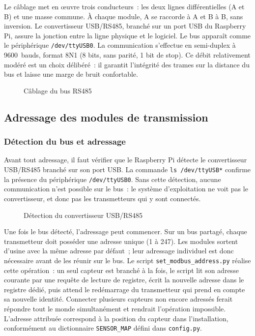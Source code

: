 Le câblage met en œuvre trois conducteurs~: les deux lignes différentielles (A et B) et une masse commune. À chaque module, A se raccorde à A et B à B, sans inversion. Le convertisseur USB/RS485, branché sur un port USB du Raspberry Pi, assure la jonction entre la ligne physique et le logiciel. Le bus apparaît comme le périphérique \texttt{/dev/ttyUSB0}. La communication s'effectue en semi-duplex à 9600~bauds, format 8N1 (8 bits, sans parité, 1 bit de stop). Ce débit relativement modéré est un choix délibéré~: il garantit l'intégrité des trames sur la distance du bus et laisse une marge de bruit confortable.

\begin{figure}[htbp]
  \centering
  \caption{Câblage du bus RS485}
  \label{fig:daisy_chain}
\end{figure}

\subsection{Adressage des modules de transmission}

\subsubsection{Détection du bus et adressage}

Avant tout adressage, il faut vérifier que le Raspberry Pi détecte le convertisseur USB/RS485 branché sur son port USB. La commande \texttt{ls /dev/ttyUSB*} confirme la présence du périphérique \texttt{/dev/ttyUSB0}. Sans cette détection, aucune communication n'est possible sur le bus~: le système d'exploitation ne voit pas le convertisseur, et donc pas les transmetteurs qui y sont connectés.

\begin{figure}[htbp]
  \centering
  \caption{Détection du convertisseur USB/RS485}
  \label{fig:scan_usb}
\end{figure}

Une fois le bus détecté, l'adressage peut commencer. Sur un bus partagé, chaque transmetteur doit posséder une adresse unique (1 à 247). Les modules sortent d'usine avec la même adresse par défaut~; leur adressage individuel est donc nécessaire avant de les réunir sur le bus. Le script \texttt{set\_modbus\_address.py} réalise cette opération~: un seul capteur est branché à la fois, le script lit son adresse courante par une requête de lecture de registre, écrit la nouvelle adresse dans le registre dédié, puis attend le redémarrage du transmetteur qui prend en compte sa nouvelle identité. Connecter plusieurs capteurs non encore adressés ferait répondre tout le monde simultanément et rendrait l'opération impossible. L'adresse attribuée correspond à la position du capteur dans l'installation, conformément au dictionnaire \texttt{SENSOR\_MAP} défini dans \texttt{config.py}.

